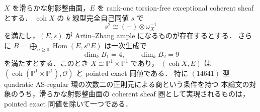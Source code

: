 \begin{theorem}[滑らかな可換対象の認識]
\label{thm:commutative-recognition}
$X$ を滑らかな射影整曲面，$E$ を rank-one torsion-free exceptional
coherent sheaf とする．
$\operatorname{coh}X$ の $k$ 線型完全自己同値 $s$ で
\[
 s^2\cong(-)\otimes\omega_X^{-1}
\]
を満たし，$(E,s)$ が Artin--Zhang ample になるものが存在するとする．
さらに $B=\bigoplus_{n\ge0}\operatorname{Hom}(E,s^nE)$ は一次生成で
\[
 \dim_k B_1=4,\qquad \dim_k B_2=9
\]
を満たすとする．このとき $X\cong\mathbb P^1\times\mathbb P^1$ であり，
$(\operatorname{coh}X,E)$ は
$(\operatorname{coh}(\mathbb P^1\times\mathbb P^1),\mathcal O)$ と pointed exact 同値である．
特に $(14641)$ 型 quadratic AS-regular 環の次数二の正則元による商という条件を持つ
本論文の対象のうち，滑らかな射影整曲面の coherent sheaf 圏として実現されるものは，
pointed exact 同値を除いて一つである．
\end{theorem}
